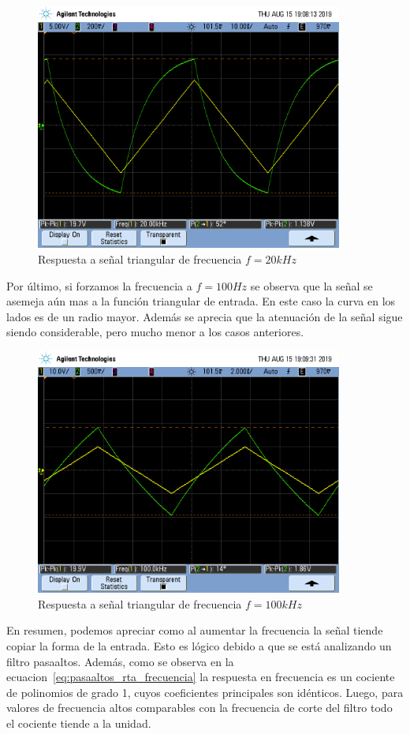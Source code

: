  \begin{figure}[H]
    \centering
    \includegraphics[width = 0.9\textwidth]{../Desarrollo/pasaaltos_triangular_20k.png}
    \caption{Respuesta a señal triangular de frecuencia $f=20kHz$}
    \label{fig:pasaaltos_triangular_media}
 \end{figure}

Por último, si forzamos la frecuencia a $f=100Hz$ se observa que la señal se asemeja aún mas a la función triangular de entrada. En este caso la curva en los lados es de un radio mayor. Además se aprecia que la atenuación de la señal sigue siendo considerable, pero mucho menor a los casos anteriores.

 \begin{figure}[H]
    \centering
    \includegraphics[width = 0.9\textwidth]{../Desarrollo/pasaaltos_triangular_100k.png}
    \caption{Respuesta a señal triangular de frecuencia $f=100kHz$}
    \label{fig:pasaaltos_triangular_alta}
 \end{figure}

 En resumen, podemos apreciar como al aumentar la frecuencia la señal tiende copiar la forma de la entrada. Esto es lógico debido a que se está analizando un filtro pasaaltos.
  Además, como se observa en la ecuacion~\ref{eq:pasaaltos_rta_frecuencia} la respuesta en frecuencia es un cociente de polinomios de grado 1, cuyos coeficientes principales son idénticos.
  Luego, para valores de frecuencia altos comparables con la frecuencia de corte del filtro todo el cociente tiende a la unidad.
